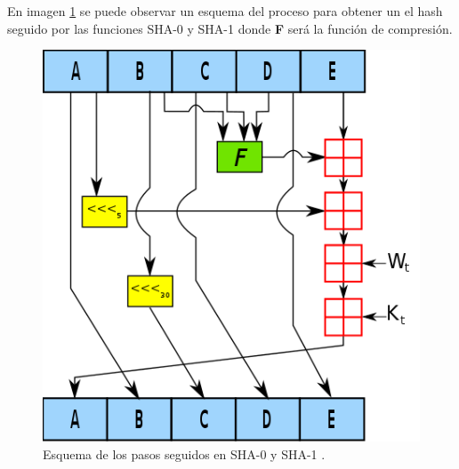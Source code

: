 En imagen \ref{sha01img} se puede observar un esquema del proceso para obtener un el hash seguido por las funciones  SHA-0 y SHA-1 donde \textbf{F} será la función de compresión.
\begin{figure}[htb]
	\centering
	\includegraphics[scale=0.5]{imagenes/sha0-1.png} 
	\caption{Esquema de los pasos seguidos en SHA-0 y SHA-1 \cite{fotosha10}.}
	\label{sha01img}
\end{figure}

